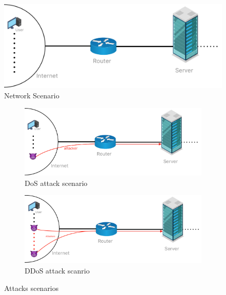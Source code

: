 \begin{figure}[ht]
  \includegraphics[scale=0.31]{imgs/scenario.png}
  \caption{Network Scenario}
  \label{fig:networkscenario}
\end{figure}

\begin{figure}[h]
	\begin{subfigure}{0.48\textwidth}
		\includegraphics[width=\textwidth]{imgs/DoS_attack.png}
		\caption{DoS attack scenario} \label{fig:DoS}
	\end{subfigure}
	\hspace*{\fill} %
	\begin{subfigure}{0.48\textwidth}
		\includegraphics[width=\textwidth]{imgs/DDoS_attack.png}
		\caption{DDoS attack scanrio} \label{fig:DDoS}
	\end{subfigure}
	\caption{Attacks scenarios}
	\label{fig:atks}
\end{figure}

